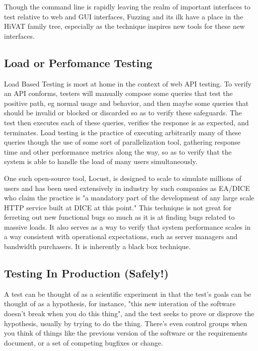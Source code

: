  Though the command line is rapidly leaving the realm of important interfaces to test relative to web and GUI interfaces, Fuzzing and its ilk have a place in the HiVAT family tree, especially as the technique inspires new tools for these new interfaces.

\subsection{Load or Perfomance Testing}
Load Based Testing is most at home in the context of web API testing. To verify an API conforms, testers will manually compose some queries that test the positive path, eg normal usage and behavior, and then maybe some queries that should be invalid or blocked or discarded so as to verify these safeguards. The test then executes each of these queries, verifies the response is as expected, and terminates. Load testing is the practice of executing arbitrarily many of these queries though the use of some sort of parallelization tool, gathering response time and other performance metrics along the way, so as to verify that the system is able to handle the load of many users simultaneously.

One such open-source tool, Locust\citep{heymanlocust}, is designed to scale to simulate millions of users and has been used extensively in industry by such companies as EA/DICE who claim the practice is "a mandatory part of the development of any large scale HTTP service built at DICE at this point." This technique is not great for ferreting out new functional bugs so much as it is at finding bugs related to massive loads. It also serves as a way to verify that system performance scales in a way consistent with operational expectations, such as server managers and bandwidth purchasers. It is inherently a black box technique.

\subsection{Testing In Production (Safely!)}
A test can be thought of as a scientific experiment in that the test's goals can be thought of as a hypothesis, for instance, "this new interation of the software doesn't break when you do this thing", and the test seeks to prove or disprove the hypothesis, usually by trying to do the thing. There's even control groups when you think of things like the previous version of the software or the requirements document, or a set of competing bugfixes or change.

